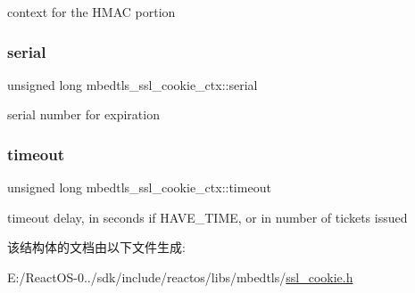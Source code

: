 context for the H\+M\+AC portion \mbox{\label{structmbedtls__ssl__cookie__ctx_abd16c13055ac6f87e93ffbdfa4a957bf}} 
\subsubsection{\texorpdfstring{serial}{serial}}
{\footnotesize\ttfamily unsigned long mbedtls\+\_\+ssl\+\_\+cookie\+\_\+ctx\+::serial}

serial number for expiration \mbox{\label{structmbedtls__ssl__cookie__ctx_adf87598d619f8fcf161965301c423ffb}} 
\subsubsection{\texorpdfstring{timeout}{timeout}}
{\footnotesize\ttfamily unsigned long mbedtls\+\_\+ssl\+\_\+cookie\+\_\+ctx\+::timeout}

timeout delay, in seconds if H\+A\+V\+E\+\_\+\+T\+I\+ME, or in number of tickets issued 

该结构体的文档由以下文件生成\+:\begin{DoxyCompactItemize}
\item 
E\+:/\+React\+O\+S-\/0../sdk/include/reactos/libs/mbedtls/\hyperlink{ssl__cookie_8h}{ssl\+\_\+cookie.\+h}\end{DoxyCompactItemize}
